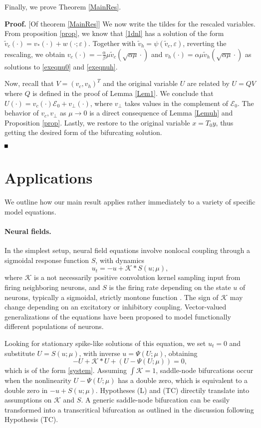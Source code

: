 \documentclass[10pt]{article}
\newenvironment{Proof}%
 {\begin{trivlist} \item[]{\bf Proof. }}%
 {\hspace*{\fill}$\rule{.4\baselineskip}{.4\baselineskip}$\end{trivlist}}
\newcommand{\eps}{\varepsilon}
\newcommand{\K}{\mathcal{K}}
\begin{document}
Finally, we prove Theorem \ref{MainRes}.
\begin{Proof}[Of theorem \ref{MainRes}] We now write the tildes for the rescaled variables. From proposition \ref{prop}, we know that \eqref{1dnl} has a solution of the form $\tilde{v}_c(\cdot) = v_*(\cdot)+w(\cdot;\eps)$. Together with $\tilde{v}_h = \psi(\tilde{v}_c,\eps)$, reverting the rescaling, we obtain $v_c(\cdot) = -\frac{\alpha}{\beta}\mu \tilde{v}_c(\sqrt{\alpha\mu }\cdot)$ and $v_h(\cdot) = \alpha\mu \tilde{v}_h(\sqrt{\alpha\mu}\cdot)$ as solutions to \eqref{exeqnu0} and \eqref{exeqnuh}.

 Now, recall that $V=(v_c,v_h)^T$ and the original variable $U$ are related by $U= QV$ where $Q$ is defined in the proof of Lemma \ref{Lem1}. We conclude that $U(\cdot)=v_c(\cdot)\mathcal{E}_0+v_{\perp}(\cdot)$, where $v_{\perp}$ takes values in the complement of $\mathcal{E}_0$. The behavior of $v_c,v_{\perp}$ as $\mu \to 0$ is a direct consequence of Lemma \ref{Lemuh} and Proposition \ref{prop}. Lastly, we restore to the original variable $x = T_0y$, thus getting the desired form of the bifurcating solution.

\end{Proof}



\section{Applications}\label{s:app}

We outline how our main result applies rather immediately to a variety of specific model equations. 

\paragraph{Neural fields.}

In the simplest setup, neural field equations involve nonlocal coupling through a sigmoidal response function $S$, with dynamics 
\[
u_t=-u+\K*S(u;\mu),
\]
where $\K$ is a not necessarily positive convolution kernel sampling input from firing neighboring neurons, and $S$ is the firing rate depending on the state $u$ of neurons, typically a sigmoidal, strictly montone function \cite{neuralfieldrev}. The sign of $\K$ may change depending on an excitatory or inhibitory coupling. Vector-valued generalizations of the equations have been proposed to model functionally different populations of neurons. 

Looking for stationary spike-like solutions of this equation, we set $u_t=0$ and substitute $U=S(u;\mu)$, with inverse $u=\Psi(U;\mu)$, obtaining
\[
-U+\K*U+(U-\Psi(U;\mu))=0,
\]
which is of the form \eqref{system}. Assuming $\int\K=1$, saddle-node bifurcations occur when the nonlinearity $U-\Psi(U;\mu)$ has a double zero, which is equivalent to a double zero in $-u+S(u;\mu)$. Hypotheses (L) and (TC) directily translate into assumptions on $\K$ and $S$. A generic saddle-node bifurcation can be easily transformed into a transcritical bifurcation as outlined in the discussion following Hypothesis (TC). 
\end{document}
